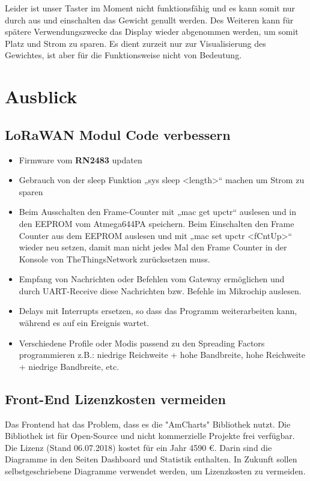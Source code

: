 Leider ist unser Taster im Moment nicht funktionsfähig und es kann somit nur durch aus und einschalten das Gewicht genullt werden. Des Weiteren kann für spätere Verwendungszwecke das Display wieder abgenommen werden, um somit Platz und Strom zu sparen. Es dient zurzeit nur zur Visualisierung des Gewichtes, ist aber für die Funktionsweise nicht von Bedeutung. 

\chapter{Ausblick}
\section{LoRaWAN Modul Code verbessern}
\begin{itemize}
    \item Firmware vom \textbf{RN2483} updaten
    \item Gebrauch von der sleep Funktion „sys sleep <length>“ machen um Strom zu sparen
    \item Beim Ausschalten den Frame-Counter mit „mac get upctr“ auslesen und in den EEPROM vom Atmega644PA speichern. Beim Einschalten den Frame Counter aus dem EEPROM auslesen und mit „mac set upctr <fCntUp>“ wieder neu setzen, damit man nicht jedes Mal den Frame Counter in der Konsole von TheThingsNetwork zurücksetzen muss. 
    \item Empfang von Nachrichten oder Befehlen vom Gateway ermöglichen und durch UART-Receive diese Nachrichten bzw. Befehle im Mikrochip auslesen. 
    \item Delays mit Interrupts ersetzen, so dass das Programm weiterarbeiten kann, während es auf ein Ereignis wartet.
    \item Verschiedene Profile oder Modis passend zu den Spreading Factors programmieren z.B.: niedrige Reichweite + hohe Bandbreite, hohe Reichweite + niedrige Bandbreite, etc.
\end{itemize} 
\section{Front-End Lizenzkosten vermeiden}
Das Frontend hat das Problem, dass es die "AmCharts" Bibliothek nutzt. Die Bibliothek ist für Open-Source und nicht kommerzielle Projekte frei verfügbar. Die Lizenz (Stand 06.07.2018) kostet für ein Jahr 4590 \euro. Darin sind die Diagramme in den Seiten Dashboard und Statistik enthalten. In Zukunft sollen selbstgeschriebene Diagramme verwendet werden, um Lizenzkosten zu vermeiden.
\newpage
